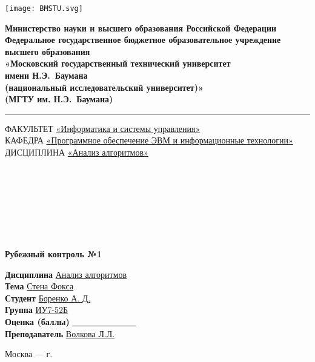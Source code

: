
\begin{titlepage}
    


    \noindent \begin{minipage}{0.20\textwidth}
        \texttt{[image: BMSTU.svg]}
    \end{minipage}
    \noindent\begin{minipage}{0.8\textwidth}\centering \singlespacing\small
        \textbf{Министерство науки и высшего образования Российской Федерации}\\
        \textbf{Федеральное государственное бюджетное образовательное учреждение высшего образования}\\
        \textbf{«Московский государственный технический университет \\ имени Н.Э.~Баумана}\\
        \textbf{(национальный исследовательский университет)»}\\
        \textbf{(МГТУ им. Н.Э.~Баумана)}
    \end{minipage}
    
    \noindent\rule{18cm}{3pt}


    \begin{flushleft}
    \small{ФАКУЛЬТЕТ \underline{«Информатика и системы управления»}\\    
    КАФЕДРА \underline{«Программное обеспечение ЭВМ и информационные технологии»}}\\
    ДИСЦИПЛИНА \underline{«Анализ алгоритмов»}
    \end{flushleft}

    \
    
    \ 
    
    \ 
    
    \ 
    
    \begin{center}
        \Large\textbf{Рубежный контроль №1}
    \end{center}


    \begin{flushleft}
        \textbf{Дисциплина} \underline{Анализ алгоритмов}\\
        \textbf{Тема} \underline{Стена Фокса}\\
        \textbf{Студент} \underline{Боренко А. Д.}\\
        \textbf{Группа} \underline{ИУ7-52Б}\\
        \textbf{Оценка (баллы)} \underline{~~~~~~~~~~~~~~~}\\
        \textbf{Преподаватель} \underline{Волкова Л.Л.}
    \end{flushleft}
    
        
    \begin{center}
        \vfill
        Москва --- \the\year г.
    \end{center}

\end{titlepage}

\setcounter{page}{2} 

\tableofcontents 